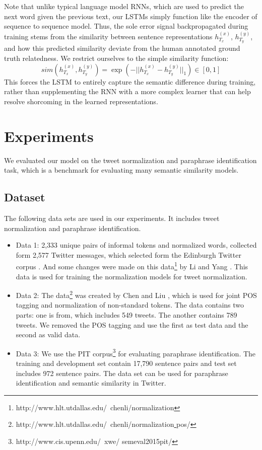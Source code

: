 \documentclass[letterpaper]{article}
\begin{document}
Note that unlike typical language model RNNs, which are used to predict the next word given the previous text, our LSTMs simply function like the encoder of sequence to sequence model. Thus, the sole error signal backpropagated during training stems from the similarity between sentence representations \textit{$h_{T_{x}}^{(x)}$}, \textit{$h_{T_{y}}^{(y)}$}, and how this predicted similarity deviate from the human annotated ground truth relatedness. We restrict ourselves to the simple similarity function: 
\begin{equation}\label{key}
sim(h_{T_{x}}^{(x)},h_{T_{y}}^{(y)}) = \exp(-||h_{T_{x}}^{(x)}-h_{T_{y}}^{(y)}||_{1}) \in [0,1]
\end{equation}
This forces the LSTM to entirely capture the semantic difference during training, rather than supplementing the RNN with a more complex learner that can help resolve shorcoming in the learned representations.

\section{Experiments}
We evaluated our model on the tweet normalization and paraphrase identification task, which is a benchmark for evaluating many semantic similarity models.

\subsection{Dataset}
The following data sets are used in our experiments. It includes tweet normalization and paraphrase identification.

\begin{itemize}
	\item Data 1: 2,333 unique pairs of informal tokens and normalized words, collected form 2,577 Twitter messages, which selected form the Edinburgh Twitter corpus \cite{pennell-liu:2011:IJCNLP-2011}. And some changes were made on this data\footnote{http://www.hlt.utdallas.edu/~chenli/normalization} by Li and Yang . This data is used for training the normalization models for tweet normalization.
	\item Data 2: The data\footnote{http://www.hlt.utdallas.edu/~chenli/normalization\underline{ }pos/} was created by Chen and Liu , which is used for joint POS tagging and normalization of non-standard tokens. The data contains two parts: one is from, which includes 549 tweets. The another contains 789 tweets. We removed the POS tagging and use the first as test data and the second as valid data.
	\item Data 3: We use the PIT corpus\footnote{http://www.cis.upenn.edu/~xwe/
	semeval2015pit/} for evaluating paraphrase identification. The training and development set contain 17,790 sentence pairs and test set includes 972 sentence pairs\cite{xu-callisonburch-dolan:2015:SemEval}. The data set can be used for paraphrase identification and semantic similarity in Twitter.
\end{itemize}
\end{document}
